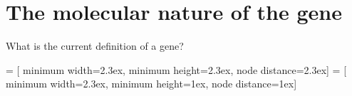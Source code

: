 \section{The molecular nature of the gene}

\begin{frame}[t]
    What is the current definition of a gene?

\end{frame}

 = [
    minimum width=2.3ex, minimum height=2.3ex, node distance=2.3ex]
 = [
    minimum width=2.3ex, minimum height=1ex, node distance=1ex]


